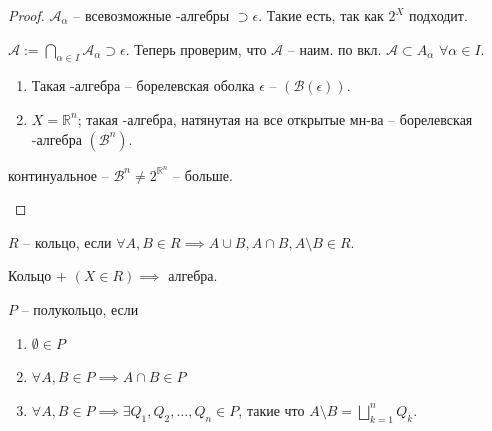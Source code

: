 \begin{proof}
    $\mathcal{A}_{\alpha}$ -- всевозможные \sigma-алгебры $\supset \epsilon$. Такие есть, так как $2^X$ подходит.

    $\mathcal{A} := \bigcap_{\alpha \in I} \mathcal{A}_{\alpha} \supset \epsilon$. Теперь проверим, что $\mathcal{A}$ -- наим. по вкл. $\mathcal{A} \subset A_{\alpha}$ $\forall \alpha \in I$.

    \begin{definition}
        \begin{enumerate}
            \item Такая \sigma-алгебра -- борелевская оболка $\epsilon$ -- $(\mathcal{B}(\epsilon))$.
            
            \item $X = \mathbb{R}^n$; такая \sigma-алгебра, натянутая на все открытые мн-ва -- борелевская \sigma-алгебра $(\mathcal{B}^n)$.
        \end{enumerate}
    \end{definition}

    \begin{remark}
        континуальное -- $\mathcal{B}^n \neq 2^{\mathbb{R}^n}$ -- больше.
    \end{remark}
\end{proof}

\begin{definition}
    $R$ -- кольцо, если $\forall A, B \in R \implies A \cup B, A \cap B, A \setminus B \in R$.
\end{definition}

\begin{remark}
    Кольцо + $(X \in R) \implies$ алгебра.
\end{remark}

\begin{definition}
    $P$ -- полукольцо, если 
    \begin{enumerate}
        \item $\emptyset \in P$
        \item $\forall A, B \in P \implies A \cap B \in P$
        \item $\forall A, B \in P \implies \exists Q_1, Q_2, \dots, Q_n \in P$, такие что $A \setminus B = \bigsqcup_{k = 1}^{n}Q_k$.
    \end{enumerate}
\end{definition}

